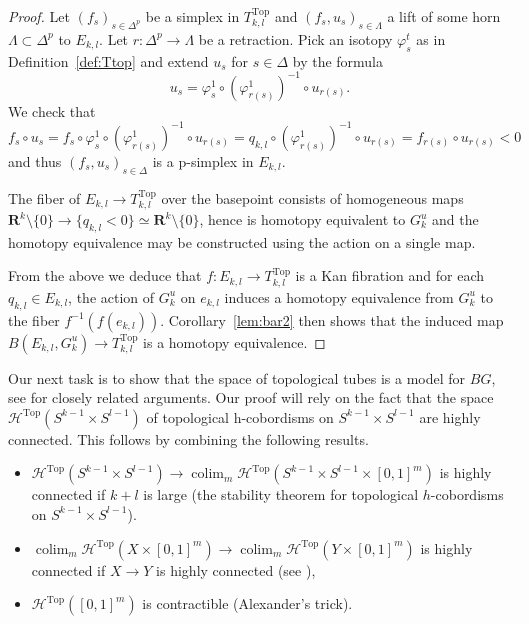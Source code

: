 \documentclass[reqno]{amsart}
\newcommand{\THOMAS}[1]%
	{\begin{quotation}{\footnotesize\textcolor{brown}{\textbf{Thomas:} #1}}\end{quotation}}
\theoremstyle{theorem}
\theoremstyle{remark}
\theoremstyle{definition}
\DeclareMathOperator*{\colim}{colim}
\newcommand{\HH}{\mathcal{H}}
\newcommand{\R}{\mathbf{R}}
\newcommand{\TOP}{\mathrm{Top}}
\begin{document}
\begin{proof}
Let $(f_s)_{s\in \Delta^p}$ be a simplex in $T^\TOP_{k,l}$ and $(f_s,u_s)_{s\in\Lambda}$ a lift
of some horn $\Lambda\subset \Delta^p$ to $E_{k,l}$. Let $r:\Delta^p\to \Lambda$ be a retraction.
Pick an isotopy $\varphi^t_s$ as in Definition~\ref{def:Ttop} and extend $u_s$ for $s\in \Delta$ by the formula
\[u_s=\varphi^1_s\circ (\varphi^1_{r(s)})^{-1}\circ u_{r(s)}.\]
We check that 
\[f_s\circ u_s=f_s\circ \varphi^1_s\circ (\varphi^1_{r(s)})^{-1}\circ u_{r(s)}=q_{k,l}\circ(\varphi^1_{r(s)})^{-1}\circ u_{r(s)}=f_{r(s)}\circ u_{r(s)}<0\]
and thus $(f_s,u_s)_{s\in \Delta}$ is a p-simplex in $E_{k,l}$.




The fiber of $E_{k,l}\to T^\TOP_{k,l} $ over the basepoint consists of homogeneous maps $\R^k\setminus\{0\}\to\{q_{k,l}< 0\}\simeq \R^k\setminus\{0\}$, hence is homotopy equivalent to $G^u_k$ and the homotopy equivalence may be constructed using the action on a single map.


From the above we deduce that $f:E_{k,l} \to T^\TOP_{k,l}$ is a Kan fibration and for each $q_{k,l} \in E_{k,l}$,
the action of $G^u_k$ on $e_{k,l}$ induces a homotopy equivalence from $G^u_k$ to the fiber $f^{-1}(f(e_{k,l}))$. Corollary~\ref{lem:bar2}
then shows that the induced map $B(E_{k,l},G^u_k) \to T^\TOP_{k,l}$ is a homotopy equivalence.
\end{proof}


Our next task is to show that the space of topological tubes is a model for $BG$, see \cite[Proposition 3.1 and Proposition 5.1]{W82} for closely related arguments. Our proof will rely on the fact that the space $\HH^\TOP(S^{k-1}\times S^{l-1})$ of topological h-cobordisms on $S^{k-1}\times S^{l-1}$ are highly connected. This follows by combining the following results.
  \begin{itemize}
  \item $\HH^\TOP(S^{k-1}\times S^{l-1})\to \colim_m \HH^\TOP(S^{k-1}\times S^{l-1}\times [0,1]^m)$
    is highly connected if $k+l$ is large (the stability theorem for topological $h$-cobordisms on $S^{k-1} \times S^{l-1}$). 
  \item $\colim_m\HH^\TOP(X\times [0,1]^m)\to \colim_m\HH^\TOP(Y\times [0,1]^m)$ is highly connected if $X\to Y$ is highly connected (see \cite{BLR}),
  \item $\HH^\TOP([0,1]^m)$ is contractible (Alexander's trick).
  \end{itemize}  
  
\end{document}
